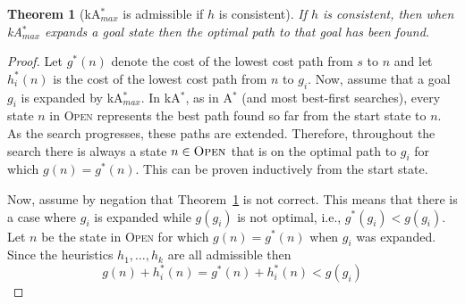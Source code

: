 \documentclass{aicom2e}
\newtheorem{theorem}{Theorem}
\newcommand{\astar}{A$^*$}
\newcommand{\kastar}{kA$^*$}
\newcommand{\kastarmax}{kA$^*_{max}$}
\newcommand{\open}{\textsc{Open}}
\newcommand{\roni}[1]{\textbf{[RS:#1]}}
\begin{document}
\begin{theorem}[\kastarmax{} is admissible if $h$ is consistent]
    If $h$ is consistent, then when
    \kastarmax{} expands a goal state then the optimal path to that goal has been found.
    \label{the:max-f}
\end{theorem}
\begin{proof}
    Let $g^*(n)$ denote the cost of the lowest cost path from $s$ to $n$
    and let $h^*_i(n)$ is the cost of the lowest cost path from $n$ to $g_i$.
    Now, assume that a goal $g_i$ is expanded by \kastarmax{}.
    In \kastar{}, as in \astar{} (and most best-first searches),
    every state $n$ in \open{} represents the best path found so far from the start state to $n$.
    As the search progresses, these paths are extended. %
    Therefore, throughout the search there is always a state $n\in \open{}$
    that is on the optimal path to $g_i$ for which $g(n)=g^*(n)$. This can be proven inductively from the start state. %

    Now, assume by negation that Theorem~\ref{the:max-f} is not correct. This means that
    there is a case where $g_i$ is expanded while $g(g_i)$ is not optimal,
    i.e., $g^*(g_i)<g(g_i)$. Let $n$ be the state in \open{} for which $g(n)=g^*(n)$
    when $g_i$ was expanded. Since the heuristics $h_1,\ldots, h_k$ are all admissible
    then
    \begin{equation}
    g(n)+h_i^*(n) = g^*(n)+h_i^*(n) < g(g_i)
    \label{eq:not-optimal}
    \end{equation}


\end{proof}
\end{document}
